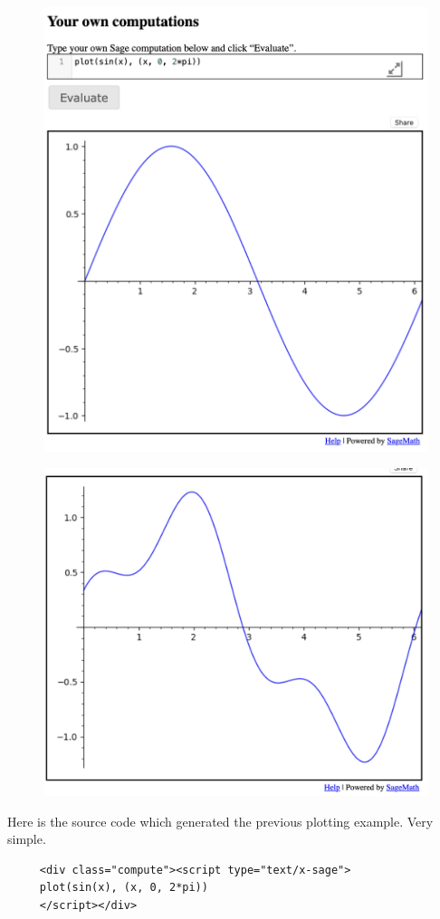 \documentclass[11pt, oneside]{article}   	%
\begin{document}
\begin{figure}[H] %
  \hspace{1in}   \includegraphics[width=3.5in.]{Graphics/shot7.png} %
\end{figure}

\begin{figure}[H] %
     \hspace{1in}  \includegraphics[width=3.5in.]{Graphics/shot8.png} %
\end{figure}

Here is the source code which generated the previous plotting example. Very simple.
\begin{verbatim}
     <div class="compute"><script type="text/x-sage">
     plot(sin(x), (x, 0, 2*pi))
     </script></div>
\end{verbatim}
\end{document}
